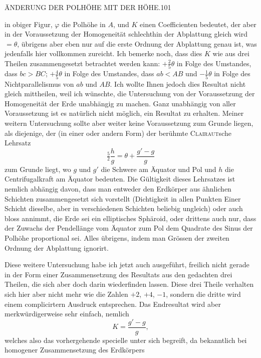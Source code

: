 \clearpage
\noindent\mbox{}\hfill ÄNDERUNG DER POLHÖHE MIT DER HÖHE.\hfill 101\par
\noindent in obiger Figur, $\varphi$ die Polhöhe in $A$, und $K$ einen Coefficienten bedeutet, der aber in der Voraussetzung der Homogeneität schlechthin der Abplattung gleich wird $=\theta$, übrigens aber eben nur auf die erste Ordnung der Abplattung genau ist, was jedenfalls hier vollkommen zureicht. Ich bemerke noch, dass dies $K$ wie aus drei Theilen zusammengesetzt betrachtet werden kann: $+\tfrac25\theta$ in Folge des Umstandes, dass $bc>BC$; $+\tfrac45\theta$ in Folge des Umstandes, dass $ab<AB$ und $-\tfrac15\theta$ in Folge des Nichtparallelismus von $ab$ und $AB$. Ich wollte Ihnen jedoch dies Resultat nicht gleich mittheilen, weil ich wünschte, die Untersuchung von der Voraussetzung der Homogeneität der Erde unabhängig zu machen. Ganz unabhängig von aller Voraussetzung ist es natürlich nicht möglich, ein Resultat zu erhalten. Meiner weitern Untersuchung sollte aber weiter keine Voraussetzung zum Grunde liegen, als diejenige, der (in einer oder andern Form) der berühmte \textsc{Clairaut}sche Lehrsatz
\[
\tfrac52\frac hg=\theta+\frac{g'-g}g
\]
zum Grunde liegt, wo $g$ und $g'$ die Schwere am Äquator und Pol und $h$ die Centrifugalkraft am Äquator bedeuten. Die Gültigkeit dieses Lehrsatzes ist nemlich abhängig davon, dass man entweder den Erdkörper aus ähnlichen Schichten zusammengesetzt sich vorstellt (Dichtigkeit in allen Punkten Einer Schicht dieselbe, aber in verschiedenen Schichten beliebig ungleich) oder auch bloss annimmt, die Erde sei ein elliptisches Sphäroid, oder drittens auch nur, dass der Zuwachs der Pendellänge vom Äquator zum Pol dem Quadrate des Sinus der Polhöhe proportional sei. Alles übrigens, indem man Grössen der zweiten Ordnung der Abplattung ignorirt.

Diese weitere Untersuchung habe ich jetzt auch ausgeführt, freilich nicht gerade in der Form einer Zusammensetzung des Resultats aus den gedachten drei Theilen, die sich aber doch darin wiederfinden lassen. Diese drei Theile verhalten sich hier aber nicht mehr wie die Zahlen $+2$, $+4$, $-1$, sondern die dritte wird einem complicirtern Ausdruck entsprechen. Das Endresultat wird aber merkwürdigerweise sehr einfach, nemlich
\[
K=\frac{g'-g}g,
\]
welches also das vorhergehende specielle unter sich begreift, da bekanntlich bei homogener Zusammensetzung des Erdkörpers
